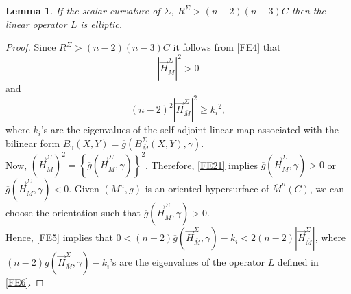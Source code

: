 \documentclass[10pt,a4paper]{amsart}
\newtheorem{lemma}{Lemma}
\begin{document}
\begin{lemma}\label{lemma3}
    If the scalar curvature of $\Sigma$, $R^{\Sigma}>(n-2)(n-3) C$ then the linear operator $L$ is elliptic.
\end{lemma}

\begin{proof}
    Since $R^{\Sigma}>(n-2)(n-3) C$ it follows from \eqref{FE4} that 
    \begin{equation}\label{FE21}
        \left|\vec{H}^{\Sigma}_{\overline{M}}\right|^2>0
    \end{equation}and
    \begin{equation} \label{FE5}
        (n-2)^2\left|\vec{H}^{\Sigma}_{\overline{M}}\right|^2\ge {k_i}^2,
    \end{equation}
    where $k_i$'s are the eigenvalues of the self-adjoint linear map associated with the bilinear form $B_{\gamma}(X, Y)= \overline{g}\left(B^{\Sigma}_{\overline{M}}(X, Y), \gamma\right)$.\\
    Now, $\left(\vec{H}^{\Sigma}_{\overline{M}}\right)^2=\left\{\overline{g}\left(\vec{H}^{\Sigma}_{\overline{M}}, \gamma \right)\right\}^2$. Therefore, \eqref{FE21} implies $\overline{g}\left(\vec{H}^{\Sigma}_{\overline{M}}, \gamma \right)>0$ or $\overline{g}\left(\vec{H}^{\Sigma}_{\overline{M}}, \gamma \right)<0$. Given $(M^n, g)$ is an oriented hypersurface of $\overline{M}^n(C)$, we can choose the orientation such that $\overline{g}\left(\vec{H}^{\Sigma}_{\overline{M}}, \gamma \right)>0$.\\
    Hence, \eqref{FE5} implies that $0<(n-2)\overline{g}\left(\vec{H}^{\Sigma}_{\overline{M}}, \gamma \right)-k_i<2(n-2)\left|\vec{H}^{\Sigma}_{\overline{M}}\right|$, where $(n-2)\overline{g}\left(\vec{H}^{\Sigma}_{\overline{M}}, \gamma \right)-k_i$'s are the eigenvalues of the operator $L$ defined in \eqref{FE6}.
\end{proof}
\end{document}
